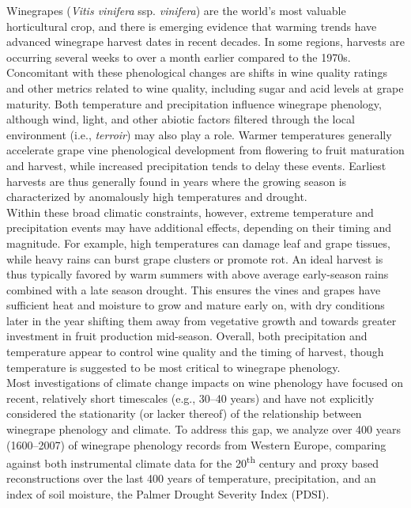 \documentclass[final]{nature}
\begin{document}
\noindent Winegrapes (\emph{Vitis vinifera} ssp. \emph{vinifera}) are the world's most valuable horticultural crop, and there is emerging evidence that warming trends have advanced winegrape harvest dates in recent decades\cite{Jones:2000br,schultzjones,tomasi2011,odo2012,webb2012}. In some regions, harvests are occurring several weeks to over a month earlier compared to the 1970s\cite{Duchene:2005bd,Seguin2005,webb2011}. Concomitant with these phenological changes are shifts in wine quality ratings\cite{jones2005} and other metrics related to wine quality\cite{mori2007}, including sugar and acid levels at grape maturity\cite{Jones:2000br}. Both temperature and precipitation influence winegrape phenology, although wind, light, and other abiotic factors filtered through the local environment (i.e., \emph{terroir}) may also play a role\cite{Gladstones2011}. Warmer temperatures generally accelerate grape vine phenological development from flowering to fruit maturation and harvest, while increased precipitation tends to delay these events\cite{jones2013}. Earliest harvests are thus generally found in years where the growing season is characterized by anomalously high temperatures and drought\cite{Jones:2000br}.\\
\indent Within these broad climatic constraints, however, extreme temperature and precipitation events may have additional effects, depending on their timing and magnitude. For example, high temperatures can damage leaf and grape tissues\cite{greer2010,Gladstones2011}, while heavy rains can burst grape clusters or promote rot\cite{jones2013}. An ideal harvest is thus typically favored by warm summers with above average early-season rains combined with a late season drought. This ensures the vines and grapes have sufficient heat and moisture to grow and mature early on, with dry conditions later in the year shifting them away from vegetative growth and towards greater investment in fruit production mid-season\cite{chaves2010,jones2013,baciocco2014}. Overall, both precipitation\cite{vanlee2009} and temperature\cite{baciocco2014} appear to control wine quality and the timing of harvest\cite{odo2012,webb2012}, though temperature is suggested to be most critical to winegrape phenology\cite{coombe1987,jones2005}.\\
\indent Most investigations of climate change impacts on wine phenology have focused on recent, relatively short timescales (e.g., 30--40 years\cite{Duchene:2005bd,tomasi2011,webb2012}) and have not explicitly considered the stationarity (or lacker thereof) of the relationship between winegrape phenology and climate. To address this gap, we analyze over 400 years (1600--2007) of winegrape phenology records from Western Europe\cite{Daux2012}, comparing against both instrumental climate data for the 20\textsuperscript{th} century\cite{Harris2014} and proxy based reconstructions over the last 400 years of temperature\cite{Luterbacher2004}, precipitation\cite{Pauling2006}, and an index of soil moisture, the Palmer Drought Severity Index\cite{CookOWDA2015} (PDSI).\\
\end{document}
